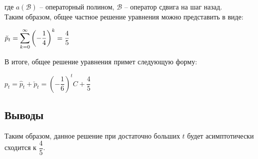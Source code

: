 \documentclass[14pt,fleqn]{extarticle}
\begin{document}
	где $a(\mathcal{B})$ -- операторный полином, $\mathcal{B}$ -- оператор сдвига на шаг назад.\\
	Таким образом, общее частное решение уравнения можно представить в виде:
	\begin{center}
		$\breve{p}_t = \smashoperator[r]{\sum_{k=0}^{\infty}}\left(-\dfrac{1}{4}\right)^k = \dfrac{4}{5}$
	\end{center}
	В итоге, общее решение уравнения примет следующую форму:
	\begin{center}
		$p_t = \hat{p}_t + \breve{p}_t = \left(-\dfrac{1}{6}\right)^tC + \dfrac{4}{5}$
	\end{center}
	\subsection*{Выводы}
	Таким образом, данное решение при достаточно больших $t$ будет асимптотически сходится к $\dfrac{4}{5}$.
\end{document}
